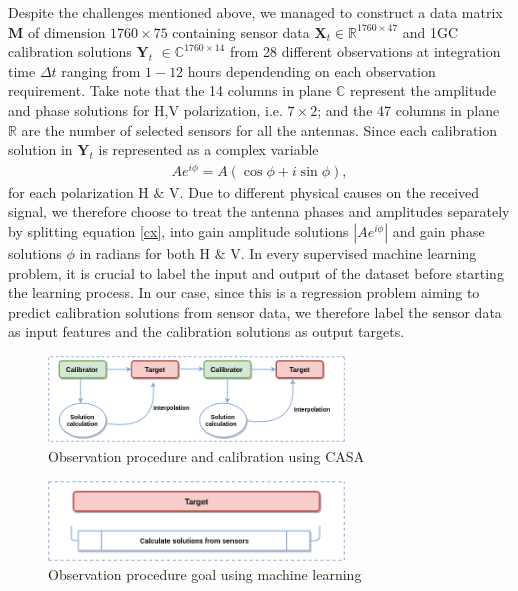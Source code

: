 Despite the challenges mentioned above, we managed to construct a data matrix $\textbf{M}$ of dimension  $1760\times 75$ containing sensor data $\textbf{X}_t\in \mathbb{R}^{1760 \times 47}$ and 1GC calibration solutions $\textbf{Y}_t$ $\in \mathbb{C}^{1760 \times 14}$ from 28 different observations at integration time $\Delta t$ ranging from $1-12$ hours dependending on each observation requirement. Take note that the 14 columns in plane $\mathbb{C}$ represent the amplitude and phase solutions for H,V polarization, i.e. $7 \times 2$; and the 47 columns in plane $\mathbb{R}$ are the number of selected sensors for all the antennas. Since each calibration solution in $\textbf{Y}_t$ is represented as a complex variable \begin{align}
Ae^{i\phi}= A(\cos\phi + i\sin\phi), \label{cx}
\end{align} for each polarization H $\&$ V. Due to different physical causes on the received signal, we therefore choose to treat the antenna phases and amplitudes separately by splitting equation \ref{cx}, into gain amplitude solutions  $\left|Ae^{i\phi}\right|$ and gain phase solutions $\phi$ in radians for both H $\&$ V. In every supervised machine learning problem, it is crucial to label the input and output of the dataset before starting the learning process. In our case, since this is a regression problem aiming to predict calibration solutions from sensor data, we therefore label the sensor data as input features and the calibration solutions as output targets.
    
\begin{figure}[H]
  \centering
    \includegraphics[width=0.7\textwidth]{images/cal4.png}
    \caption{Observation procedure and calibration using CASA}
  \label{Cal2}
\end{figure}

\begin{figure}[H]
  \centering
    \includegraphics[width=0.7\textwidth]{images/Cal3.png}
    \caption{Observation procedure goal using machine learning}
  \label{Cal3}
\end{figure}

